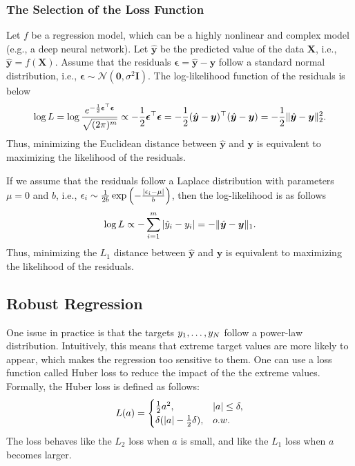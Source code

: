     \subsubsection{The Selection of the Loss Function}  
        Let $f$ be a regression model, which can be a highly nonlinear and complex model (e.g., a deep neural network).
        Let $\hat{\bm{y}}$ be the predicted value of the data $\bm{X}$, i.e., $\hat{\bm{y}} = f(\bm{X})$.
        Assume that the residuals $\bm{\epsilon} = \hat{\bm{y}} - \bm{y}$ follow a standard normal distribution, i.e., $\bm{\epsilon} \sim \mathcal{N}(\bm{0}, \sigma^2 \bm{I})$.
        The log-likelihood function of the residuals is below
            \begin{equation}
                \log L = \log{ \frac{ e^{-\frac{1}{2} \bm{\epsilon}^\top \bm{\epsilon}} }{\sqrt{(2\pi)^m }}} \propto -\frac{1}{2} \bm{\epsilon}^\top \bm{\epsilon} = -\frac{1}{2}(\hat{\bm{y}} - \bm{y})^\top (\hat{\bm{y}} - \bm{y}) = -\frac{1}{2} \lVert\hat{\bm{y}} - \bm{y}\rVert^2_2 .
            \end{equation}
        Thus, minimizing the Euclidean distance between $\hat{\bm{y}}$ and $\bm{y}$ is equivalent to maximizing  the likelihood of the residuals.
        
        If we assume that the residuals follow a Laplace distribution with parameters $\mu=0$ and $b$, i.e., $\epsilon_i \sim \frac{1}{2b} \exp{\left( -\frac{\ensuremath{| \epsilon_i - \mu |}}{b}\right)}$, then the log-likelihood is as follows
            \begin{equation}
                \log L \propto  -\sum_{i=1}^{m}{| \hat{y}_i - y_i |} = - \lVert\hat{\bm{y}} - \bm{y}\rVert_1.
            \end{equation}
        Thus, minimizing the $L_1$ distance between $\hat{\bm{y}}$ and $\bm{y}$ is equivalent to maximizing  the likelihood of the residuals.
        

    \subsection{Robust Regression}
        One issue in practice is that the targets $y_1, \ldots, y_{N}$ follow a power-law distribution. 
        Intuitively, this means that extreme target values are more likely to appear, which makes the regression too sensitive to them.
        One can use a loss function called Huber loss to reduce the impact of the the extreme values.
        Formally, the Huber loss is defined as follows:
            \begin{equation}
                L(a) = \begin{cases}
                            \frac{1}{2} a^2 , &| a | \le \delta, \\
                            \delta (| a | - \frac{1}{2}\delta) , & o.w.
                       \end{cases}
            \end{equation}
        The loss behaves like the $L_2$ loss when $a$ is small, and  like the $L_1$ loss when $a$ becomes larger. 
        

